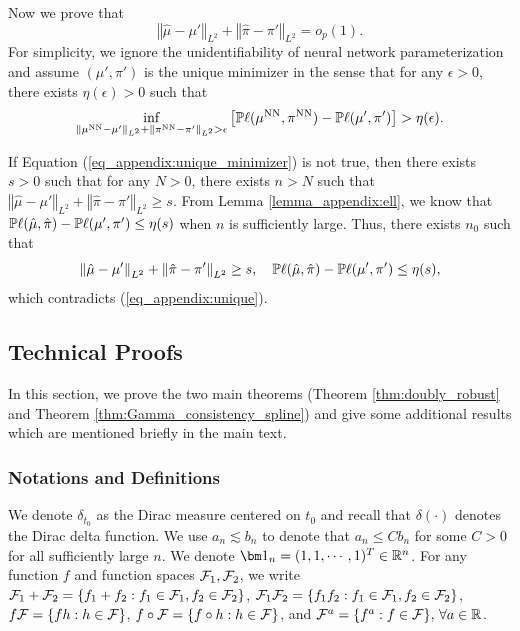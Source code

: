 Now we prove that 
\begin{equation}\label{eq_appendix:unique_minimizer}
\left\Vert \hat{\mu}-\mu'\right\Vert _{L^{2}}+\left\Vert \hat{\pi}-\pi'\right\Vert _{L^{2}}=o_{p}(1).    
\end{equation}
For simplicity, we ignore the unidentifiability
of neural network parameterization and assume $(\mu',\pi')$ is the
unique minimizer in the sense that for any $\epsilon>0$, there exists
$\eta(\epsilon)>0$ such that 
\begin{equation}\label{eq_appendix:unique}
\inf_{\left\Vert \mu^{\text{NN}}-\mu'\right\Vert _{L^{2}}+\left\Vert \pi^{\text{NN}}-\pi'\right\Vert _{L^{2}}>\epsilon}\left[\P\ell(\mu^{\text{NN}},\pi^{\text{NN}})-\P\ell(\mu',\pi')\right]>\eta(\epsilon).
\end{equation}

If Equation (\ref{eq_appendix:unique_minimizer}) is not true, then there exists $s>0$ such that for any $N>0$, there exists $n>N$ such that $\left\Vert \hat{\mu}-\mu'\right\Vert _{L^{2}}+\left\Vert \hat{\pi}-\pi'\right\Vert _{L^{2}}\ge s$. From Lemma \ref{lemma_appendix:ell}, we know that 
$\P\ell(\hat{\mu},\hat{\pi})-\P\ell(\mu',\pi')\le\eta(s)$ when $n$ is sufficiently large. Thus, there exists $n_0$ such that
$$\left\Vert \hat{\mu}-\mu'\right\Vert _{L^{2}}+\left\Vert \hat{\pi}-\pi'\right\Vert _{L^{2}}\ge s,\quad
\P\ell(\hat{\mu},\hat{\pi})-\P\ell(\mu',\pi')\le\eta(s),
$$
which contradicts (\ref{eq_appendix:unique}).


\subsection{Technical Proofs}
In this section, we prove the two main theorems  (Theorem \ref{thm:doubly_robust} and Theorem \ref{thm:Gamma_consistency_spline}) and give some additional results which are mentioned briefly in the main text. 


\subsubsection{Notations and Definitions}
We denote $\delta_{t_0}$ as the Dirac measure centered on $t_0$ and recall that $\delta(\cdot)$ denotes the Dirac delta function. 
We use $a_n\lesssim b_n$ to denote that $a_n\le Cb_n$ for some $C>0$ for all sufficiently large $n$.
We denote $\vecI_n=(1,1,\cdots,1)^T\in\R^n$. For any function $f$ and function spaces $\F_1,\F_2$, we write $\F_1+\F_2=\{f_1+f_2:f_1\in\F_1,f_2\in\F_2\}$,  $\F_1\F_2=\{f_1f_2:f_1\in\F_1,f_2\in\F_2\}$, $f\F=\{fh:h\in\F\}$, $f\circ\F=\{f\circ h:h\in\F\}$, and $\F^{a}=\{f^{a}:f\in\F\},\,\forall a\in\R$.

